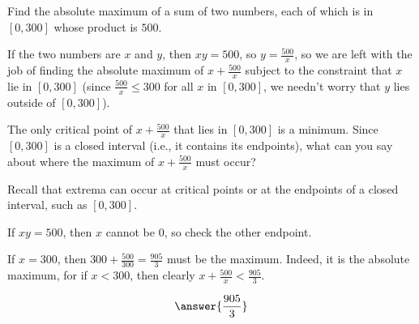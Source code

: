 \documentclass{ximera}
\author{Gregory Hartman \and Matthew Carr}
\begin{document}
\begin{exercise}



Find the absolute maximum of a sum of two numbers, each of which is in $[0,300]$ whose product is $500$.

\begin{hint}
If the two numbers are $x$ and $y$, then $xy=500$, so $y=\frac{500}{x}$, so we are left with the job of finding the absolute maximum of $x+\frac{500}{x}$ subject to the constraint that $x$ lie in $[0,300]$ (since $\frac{500}{x}\le300$ for all $x$ in $[0,300]$, we needn't worry that $y$ lies outside of $[0,300]$).
\end{hint}
\begin{hint}
The only critical point of $x+\frac{500}{x}$ that lies in $[0,300]$ is a minimum. Since $[0,300]$ is a closed interval (i.e., it contains its endpoints), what can you say about where the maximum of $x+\frac{500}{x}$ must occur?
\end{hint}
\begin{hint}
Recall that extrema can occur at critical points or at the endpoints of a closed interval, such as $[0,300]$. 
\end{hint}
\begin{hint}
If $xy=500$, then $x$ cannot be $0$, so check the other endpoint.
\end{hint}
\begin{hint}
If $x=300$, then $300+\frac{500}{300}=\frac{905}{3}$ must be the maximum. Indeed, it is the absolute maximum, for if $x<300$, then clearly $x+\frac{500}{x}<\frac{905}{3}$.
\end{hint}
\begin{prompt}
  \[\answer{\frac{905}{3}}\]
\end{prompt}

\end{exercise}
\end{document}
